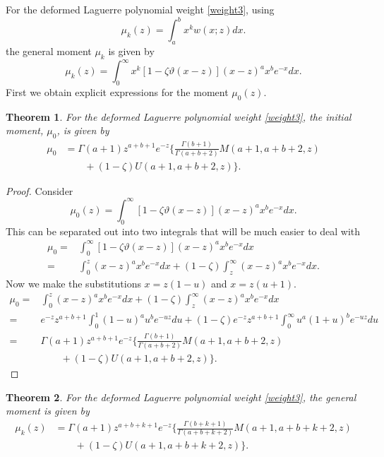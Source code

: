 \documentclass[12pt]{article}
\def\e{e^{-z}}
\newtheorem{mydef}{Theorem}[section]
\numberwithin{figure}{section}
\numberwithin{equation}{section}
\numberwithin{table}{section}
\begin{document}
For the deformed Laguerre polynomial weight \eqref{weight3}, using
\begin{equation}
\mu_k(z)=\int^b_ax^kw(x;z)dx.\nonumber
\end{equation}
the general moment $\mu_k$ is given by
\begin{equation}
\mu_k(z)=\int_0^\infty x^k[1-\zeta\vartheta(x-z)](x-z)^ a x^ b e^{-x}dx.\label{weight32}
\end{equation}
First we obtain explicit expressions for the moment $\mu_0(z)$.
\begin{mydef}
For the deformed Laguerre polynomial weight \eqref{weight3}, the initial moment, $\mu_0$, is given by
\begin{align}\nonumber
\mu_0&=\Gamma( a+1)z^{ a+ b+1}\e\bigg\{\tfrac{\Gamma( b+1)}{\Gamma( a+ b+2)}M( a+1, a+ b+2,z)\\
&\qquad+(1-\zeta)U( a+1, a+ b+2,z)
\bigg\}.
\end{align}
\end{mydef}
\begin{proof}
Consider
$$\mu_0(z)=\int^\infty_0[1-\zeta\vartheta(x-z)](x-z)^ a x^ b e^{-x}dx.$$
This can be separated out into two integrals that will be much easier to deal with
\begin{align}\nonumber
\mu_0=&\int^\infty_0[1-\zeta\vartheta(x-z)](x-z)^ a x^ b e^{-x}dx\\\nonumber
=&\int^z_0(x-z)^ a x^ b e^{-x}dx+(1-\zeta)\int^\infty_z(x-z)^ a x^ b e^{-x}dx.
\end{align}
Now we make the substitutions $x=z(1-u)$ and $x=z(u+1)$.
\begin{align*}
\mu_0=&\int^z_0(x-z)^ a x^ b e^{-x}dx+(1-\zeta)\int^\infty_z(x-z)^ a x^ b e^{-x}dx\\
=&\e z^{ a+ b+1}\int^1_0(1-u)^ a u^ b e^{-uz}du+(1-\zeta)\e z^{ a+ b+1}\int^\infty_0u^ a
(1+u)^ b e^{-uz}du\\
=&\Gamma( a+1)z^{ a+ b+1}\e\bigg\{\tfrac{\Gamma( b+1)}{\Gamma( a+ b+2)}M( a+1, a+ b+2,z)\\&\qquad+(1-\zeta)
U( a+1, a+ b+2,z)
\bigg\}.
\end{align*}
\end{proof}
\begin{mydef}
For the deformed Laguerre polynomial weight \eqref{weight3}, the  general moment is given by
\begin{align}\nonumber
\mu_k(z)&=\Gamma( a+1)z^{ a+ b+k+1}\e\bigg\{\tfrac{\Gamma( b+k+1)}{\Gamma( a+ b+k+2)}M( a+1, a+ b+k+2,z)\\&\qquad+(1-\zeta)
U( a+1,a+ b+k+2,z)\bigg\}.\label{gmu}
\end{align}
\end{mydef}
\end{document}
